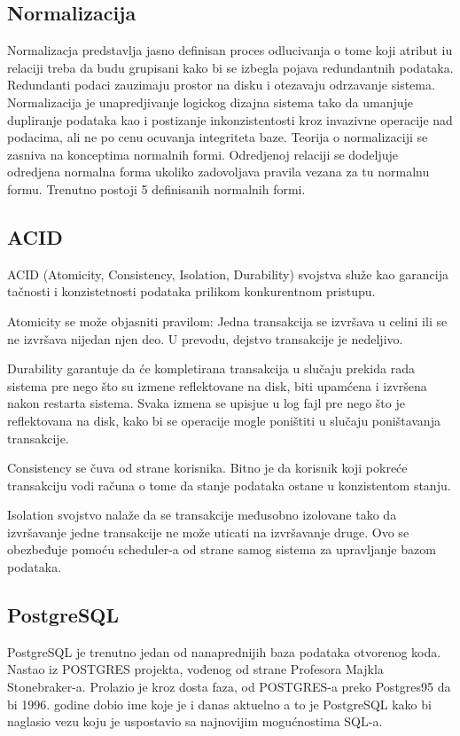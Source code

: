 \documentclass[12pt,oneside]{memoir}
\begin{document}
\subsection{Normalizacija}
Normalizacja predstavlja jasno definisan proces odlucivanja o tome koji atribut iu relaciji treba da budu grupisani kako bi se izbegla pojava redundantnih podataka. Redundanti podaci zauzimaju prostor na disku i otezavaju odrzavanje sistema. Normalizacija je unapredjivanje  logickog dizajna sistema tako da umanjuje dupliranje podataka kao i postizanje inkonzistentosti kroz invazivne operacije nad podacima, ali ne po cenu ocuvanja integriteta baze. Teorija o normalizaciji se zasniva na konceptima normalnih formi. Odredjenoj relaciji se dodeljuje odredjena normalna forma ukoliko zadovoljava pravila vezana za tu normalnu formu. Trenutno postoji 5 definisanih normalnih formi.
\subsection{ACID}

ACID (Atomicity, Consistency, Isolation, Durability) svojstva služe kao garancija tačnosti i konzistetnosti podataka prilikom konkurentnom pristupu. 

Atomicity se može objasniti pravilom: Jedna transakcija se izvršava u celini ili se ne izvršava nijedan njen deo. U prevodu, dejstvo transakcije je nedeljivo. 

Durability garantuje da će kompletirana transakcija u slučaju prekida rada sistema pre nego što su izmene reflektovane na disk, biti upamćena i izvršena nakon restarta sistema. Svaka izmena se upisjue u log fajl pre nego što je reflektovana na disk, kako bi se operacije mogle poništiti u slučaju poništavanja transakcije.

Consistency se čuva od strane korisnika. Bitno je da korisnik koji pokreće transakciju vodi računa o tome da stanje podataka ostane u konzistentom stanju.

Isolation svojstvo nalaže da se transakcije međusobno izolovane tako da izvršavanje jedne transakcije ne može uticati na izvršavanje druge. Ovo se obezbeđuje pomoću scheduler-a od strane samog sistema za upravljanje bazom podataka.

\subsection{PostgreSQL}

PostgreSQL je trenutno jedan od nanaprednijih baza podataka otvorenog koda.  Nastao iz POSTGRES projekta, vođenog od strane
Profesora Majkla Stonebraker-a. Prolazio je kroz dosta faza, od POSTGRES-a preko Postgres95 da bi 1996. godine dobio ime koje je i danas aktuelno a to je PostgreSQL kako bi naglasio vezu koju je uspostavio sa najnovijim mogućnostima SQL-a. \cite{PostgresHistory}
\end{document}
